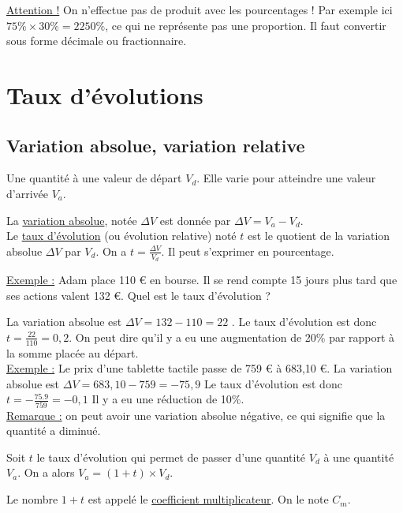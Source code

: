 \documentclass[french]{book}
\begin{document}
\underline{Attention !} On n’effectue pas de produit avec les pourcentages ! Par exemple ici $75\% \times 30\%=2250\%$, ce qui ne représente pas une proportion. Il faut convertir sous forme décimale ou fractionnaire.
\section{Taux d'évolutions}

    \subsection{Variation absolue, variation relative}

Une quantité à une valeur de départ $V_d$. Elle varie pour atteindre une valeur d’arrivée $V_a$.

\begin{defn}
La \underline{variation absolue}, notée $\Delta V$ est donnée par $\Delta V = V_a - V_d$. \\

Le \underline{taux d’évolution} (ou évolution relative) noté $t$ est le quotient de la variation absolue $\Delta V$ par $V_d$. On a $t=\frac{\Delta V}{V_d}$. Il peut s’exprimer en pourcentage.
\end{defn}

\underline{Exemple :} Adam place 110 \euro{} en bourse. Il se rend compte 15 jours plus tard que ses actions valent 132 \euro{}. Quel est le taux d’évolution ? 

La variation absolue est $\Delta V = 132- 110=22$  . Le taux d’évolution est donc $t=\frac{22}{110}=0,2$.
On peut dire qu’il y a eu une augmentation de 20\% par rapport à la somme placée au départ.\\


\underline {Exemple :} Le prix d’une tablette tactile passe de 759 \euro{} à 683,10 \euro{}.
La variation absolue est  $\Delta V =683,10 - 759 = -75,9$   Le taux d’évolution est donc $t=-\frac{75.9}{759}=-0,1$ 
Il y a eu une réduction de 10\%.\\


\underline{Remarque :} on peut avoir une variation absolue négative, ce qui signifie que la quantité a diminué.

\begin{prop} 
Soit $t$ le taux d’évolution qui permet de passer d’une quantité $V_d$ à une quantité $V_a$. On a alors $V_a=(1+t)\times V_d$.
\end{prop}

\begin{defn}
Le nombre $1+t$ est appelé le \underline{coefficient multiplicateur}. On le note $C_m$.
\vspace{0.5cm}
\end{defn}
\end{document}
